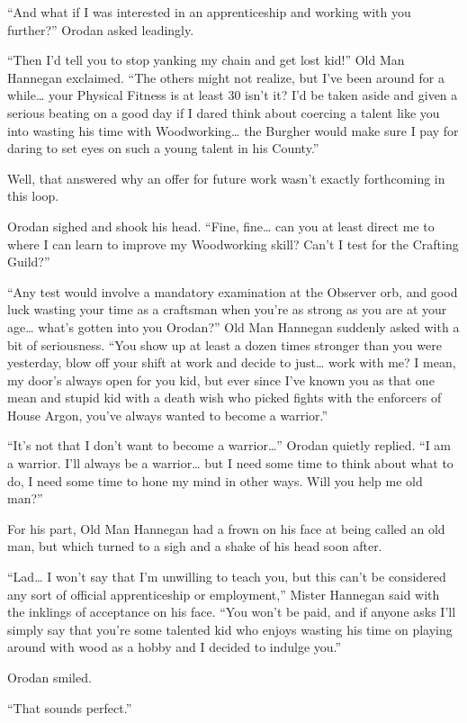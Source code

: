 \documentclass[a4paper,10pt]{book}
\begin{document}
“And what if I was interested in an apprenticeship and working with you further?” Orodan asked leadingly.\par
“Then I’d tell you to stop yanking my chain and get lost kid!” Old Man Hannegan exclaimed. “The others might not realize, but I’ve been around for a while… your Physical Fitness is at least 30 isn’t it? I’d be taken aside and given a serious beating on a good day if I dared think about coercing a talent like you into wasting his time with Woodworking… the Burgher would make sure I pay for daring to set eyes on such a young talent in his County.”\par
Well, that answered why an offer for future work wasn’t exactly forthcoming in this loop.\par
Orodan sighed and shook his head. “Fine, fine… can you at least direct me to where I can learn to improve my Woodworking skill? Can’t I test for the Crafting Guild?”\par
“Any test would involve a mandatory examination at the Observer orb, and good luck wasting your time as a craftsman when you’re as strong as you are at your age… what’s gotten into you Orodan?” Old Man Hannegan suddenly asked with a bit of seriousness. “You show up at least a dozen times stronger than you were yesterday, blow off your shift at work and decide to just… work with me? I mean, my door’s always open for you kid, but ever since I’ve known you as that one mean and stupid kid with a death wish who picked fights with the enforcers of House Argon, you’ve always wanted to become a warrior.”\par
“It’s not that I don’t want to become a warrior…” Orodan quietly replied. “I am a warrior. I’ll always be a warrior… but I need some time to think about what to do, I need some time to hone my mind in other ways. Will you help me old man?”\par
For his part, Old Man Hannegan had a frown on his face at being called an old man, but which turned to a sigh and a shake of his head soon after.\par
“Lad… I won’t say that I’m unwilling to teach you, but this can’t be considered any sort of official apprenticeship or employment,” Mister Hannegan said with the inklings of acceptance on his face. “You won’t be paid, and if anyone asks I’ll simply say that you’re some talented kid who enjoys wasting his time on playing around with wood as a hobby and I decided to indulge you.”\par
Orodan smiled.\par
“That sounds perfect.”\par
\end{document}

